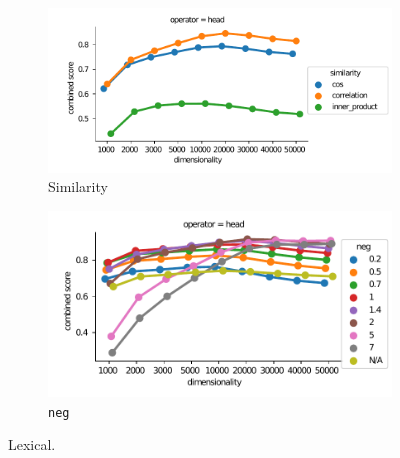 \begin{figure}[b]
  \centering

  \begin{subfigure}[t]{0.49\textwidth}
    \hspace{-20pt}
    \includegraphics[width=1.1\textwidth]{supplement/figures/lexical-interaction-similarity}

    \caption{Similarity}
    \label{fig:lexical-similarity}
  \end{subfigure}
  \begin{subfigure}[t]{0.49\textwidth}
    \includegraphics[width=\textwidth]{supplement/figures/lexical-interaction-neg}

    \caption{\texttt{neg}}
    \label{fig:lexical-neg}
  \end{subfigure}
  \caption{Lexical.}
\end{figure}
